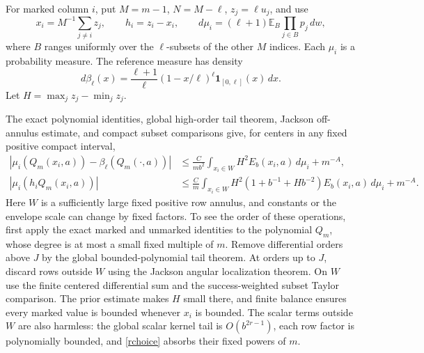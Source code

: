 \documentclass[11pt]{article}
\newcommand{\E}{\mathbb E}
\begin{document}
For marked column $i$, put $M=m-1$, $N=M-\ell$, $z_j=\ell u_j$,
and use
\[
 x_i=M^{-1}\sum_{j\ne i}z_j,\qquad h_i=z_i-x_i,\qquad
 d\mu_i=(\ell+1)\E_B\prod_{j\in B}p_j\,dw,
\]
where $B$ ranges uniformly over the $\ell$-subsets of the other
$M$ indices. Each $\mu_i$ is a probability measure. The reference
measure has density
\[
 d\beta_\ell(x)=\frac{\ell+1}{\ell}(1-x/\ell)^\ell
                  \boldsymbol1_{[0,\ell]}(x)\,dx.
\]
Let $H=\max_jz_j-\min_jz_j$.

The exact polynomial identities, global high-order tail theorem,
Jackson off-annulus estimate, and compact subset comparisons give,
for centers in any fixed positive compact interval,
\begin{align}
 |\mu_i(Q_m(x_i,a))-\beta_\ell(Q_m(\cdot,a))|
 &\le \frac C{mb^2}\int_{x_i\in W}H^2E_b(x_i,a)\,d\mu_i+m^{-A},
 \label{unmarked}\\
 |\mu_i(h_iQ_m(x_i,a))|
 &\le\frac C m\int_{x_i\in W}
 H^2(1+b^{-1}+Hb^{-2})E_b(x_i,a)\,d\mu_i+m^{-A}.
 \label{marked}
\end{align}
Here $W$ is a sufficiently large fixed positive row annulus, and
constants or the envelope scale can change by fixed factors.
To see the order of these operations, first apply the exact marked
and unmarked identities to the polynomial $Q_m$, whose degree is
at most a small fixed multiple of $m$. Remove differential orders
above $J$ by the global bounded-polynomial tail theorem. At orders
up to $J$, discard rows outside $W$ using the Jackson angular
localization theorem. On $W$ use the finite centered differential
sum and the success-weighted subset Taylor comparison. The prior
estimate makes $H$ small there, and finite balance ensures every
marked value is bounded whenever $x_i$ is bounded.
The scalar terms outside $W$ are also harmless: the global scalar
kernel tail is $O(b^{2r-1})$, each row factor is polynomially bounded,
and \eqref{rchoice} absorbs their fixed powers of $m$.
\end{document}
